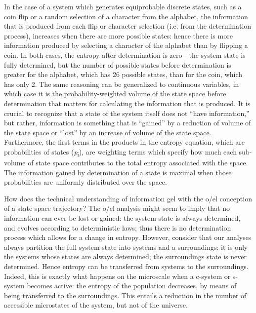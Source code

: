 In the case of a system which generates equiprobable discrete states, such as a coin flip or a random selection of a character from the alphabet, the information that is produced from each flip or character selection (i.e. from the determination process), increases when there are more possible states: hence there is more information produced by selecting a character of the alphabet than by flipping a coin. In both cases, the entropy after determination is zero—the system state is fully determined, but the number of possible states before determination is greater for the alphabet, which has 26 possible states, than for the coin, which has only 2. The same reasoning can be generalized to continuous variables, in which case it is the probability-weighted volume of the state space before determination that matters for calculating the information that is produced. It is crucial to recognize that a state of the system itself does not “have information,” but rather, information is something that is “gained” by a reduction of volume of the state space or “lost” by an increase of volume of the state space. Furthermore, the first terms in the products in the entropy equation, which are probabilities of states (\textit{p}\textsubscript{i}), are weighting terms which specify how much each sub-volume of state space contributes to the total entropy associated with the space. The information gained by determination of a state is maximal when those probabilities are uniformly distributed over the space.

How does the technical understanding of information gel with the o/el conception of a state space trajectory? The o/el analysis might seem to imply that no information can ever be lost or gained: the system state is always determined, and evolves according to deterministic laws; thus there is no determination process which allows for a change in entropy. However, consider that our analyses always partition the full system state into systems and a surroundings: it is only the systems whose states are always determined; the surroundings state is never determined. Hence entropy can be transferred from systems to the surroundings. Indeed, this is exactly what happens on the microscale when a c-system or s-system becomes active: the entropy of the population decreases, by means of being transferred to the surroundings. This entails a reduction in the number of accessible microstates of the system, but not of the universe.

